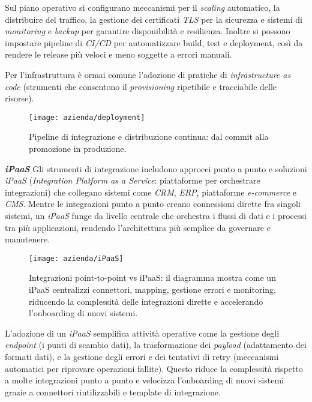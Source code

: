 Sul piano operativo si configurano meccanismi per il \emph{scaling} automatico, la distribuire del traffico, 
la gestione dei certificati \emph{TLS} per la sicurezza e sistemi di \emph{monitoring} e \emph{backup} per garantire disponibilità e resilienza. 
Inoltre si possono impostare pipeline di \emph{CI/CD} per automatizzare build, test e deployment, così da rendere le release più veloci e meno soggette a errori manuali.

Per l’infrastruttura è ormai comune l’adozione di pratiche di \emph{infrastructure as code} (strumenti che consentono il \emph{provisioning} ripetibile e tracciabile delle risorse). 

\begin{figure}[htbp]
    \centering
    \texttt{[image: azienda/deployment]}
    \caption{Pipeline di integrazione e distribuzione continua: dal commit alla promozione in produzione.}
    \label{fig:deployment}
\end{figure}


\medskip
\noindent\textbf{\emph{iPaaS}}
Gli strumenti di integrazione includono approcci punto a punto e soluzioni \emph{iPaaS} (\emph{Integration Platform as a Service}: piattaforme per orchestrare integrazioni) 
che collegano sistemi come \emph{CRM}, \emph{ERP}, piattaforme \emph{e-commerce} e \emph{CMS}. Mentre le integrazioni punto a punto creano connessioni dirette fra singoli sistemi, 
un \emph{iPaaS} funge da livello centrale che orchestra i flussi di dati e i processi tra più applicazioni, rendendo l'architettura più semplice da governare e manutenere.

\begin{figure}[H]
    \centering
    \texttt{[image: azienda/iPaaS]}
    \caption{Integrazioni point-to-point vs iPaaS: il diagramma mostra come un iPaaS centralizzi connettori, mapping, gestione errori e monitoring, riducendo la complessità delle integrazioni dirette e accelerando l'onboarding di nuovi sistemi.}
    \label{fig:iPaaS}
\end{figure}

L'adozione di un \emph{iPaaS} semplifica attività operative come la gestione degli \emph{endpoint} (i punti di scambio dati), la trasformazione dei \emph{payload} 
(adattamento dei formati dati), e la gestione degli errori e dei tentativi di retry (meccanismi automatici per riprovare operazioni fallite). 
Questo riduce la complessità rispetto a molte integrazioni punto a punto e velocizza l'onboarding di nuovi sistemi grazie a connettori riutilizzabili e template di integrazione.

